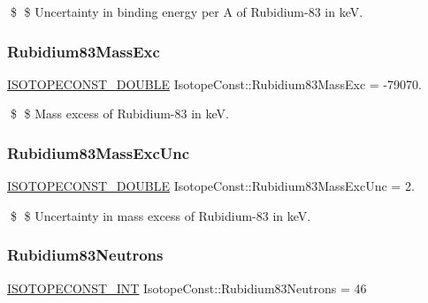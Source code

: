 \$ \$ Uncertainty in binding energy per A of Rubidium-\/83 in keV. \mbox{\label{group___isotope_const-_rubidium-_rb83_ga9f0510620276baceef0f239766fc2178}} 
\subsubsection{\texorpdfstring{Rubidium83\+Mass\+Exc}{Rubidium83MassExc}}
{\footnotesize\ttfamily \mbox{\hyperlink{group___isotope_const-_macros_ga8f45a7272ce02c0b4c65c44636ed719a}{I\+S\+O\+T\+O\+P\+E\+C\+O\+N\+S\+T\+\_\+\+D\+O\+U\+B\+LE}} Isotope\+Const\+::\+Rubidium83\+Mass\+Exc = -\/79070.}

\$ \$ Mass excess of Rubidium-\/83 in keV. \mbox{\label{group___isotope_const-_rubidium-_rb83_ga005ff527edb9dc70e60240074f66a019}} 
\subsubsection{\texorpdfstring{Rubidium83\+Mass\+Exc\+Unc}{Rubidium83MassExcUnc}}
{\footnotesize\ttfamily \mbox{\hyperlink{group___isotope_const-_macros_ga8f45a7272ce02c0b4c65c44636ed719a}{I\+S\+O\+T\+O\+P\+E\+C\+O\+N\+S\+T\+\_\+\+D\+O\+U\+B\+LE}} Isotope\+Const\+::\+Rubidium83\+Mass\+Exc\+Unc = 2.}

\$ \$ Uncertainty in mass excess of Rubidium-\/83 in keV. \mbox{\label{group___isotope_const-_rubidium-_rb83_gaecc7e03f8e86e9533b88209e84bc3f21}} 
\subsubsection{\texorpdfstring{Rubidium83\+Neutrons}{Rubidium83Neutrons}}
{\footnotesize\ttfamily \mbox{\hyperlink{group___isotope_const-_macros_ga5f18360b3e99483a35c32d789e62621c}{I\+S\+O\+T\+O\+P\+E\+C\+O\+N\+S\+T\+\_\+\+I\+NT}} Isotope\+Const\+::\+Rubidium83\+Neutrons = 46}

